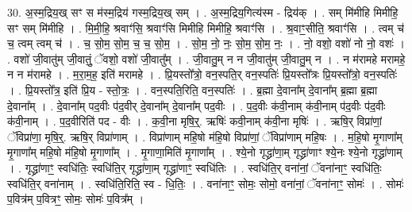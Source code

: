 \documentclass[17pt]{extarticle}
\begin{document}
30. अ॒स्म॒द्रिय॒ख् सꣳ स म॑स्म॒द्रिय॑ गस्म॒द्रिय॒ख् सम् । . अ॒स्म॒द्रिय॒गित्य॑स्म - द्रिय॑क् । . सम् मि॑मीहि मिमीहि॒ सꣳ सम् मि॑मीहि । . मि॒मी॒हि॒ श्रवाꣳ॑सि॒ श्रवाꣳ॑सि मिमीहि मिमीहि॒ श्रवाꣳ॑सि । . श्र॒वाꣳ॒॒सीति॒ श्रवाꣳ॑सि । . त्वम् च॑ च॒ त्वम् त्वम् च॑ । . च॒ सो॒म॒ सो॒म॒ च॒ च॒ सो॒म॒ । . सो॒म॒ नो॒ नः॒ सो॒म॒ सो॒म॒ नः॒ । . नो॒ वशो॒ वशो॑ नो नो॒ वशः॑ । . वशो॑ जी॒वातु॑म् जी॒वातुं॒ ॅवशो॒ वशो॑ जी॒वातु᳚म् । . जी॒वातु॒म् न न जी॒वातु॑म् जी॒वातु॒म् न । . न म॑रामहे मरामहे॒ न न म॑रामहे । . म॒रा॒म॒ह॒ इति॑ मरामहे । . प्रि॒यस्तो᳚त्रो॒ वन॒स्पति॒र् वन॒स्पतिः॑ प्रि॒यस्तो᳚त्रः प्रि॒यस्तो᳚त्रो॒ वन॒स्पतिः॑ । . प्रि॒यस्तो᳚त्र॒ इति॑ प्रि॒य - स्तो॒त्रः॒ । . वन॒स्पति॒रिति॒ वन॒स्पतिः॑ । . ब्र॒ह्मा दे॒वाना᳚म् दे॒वाना᳚म् ब्र॒ह्मा ब्र॒ह्मा दे॒वाना᳚म् । . दे॒वाना᳚म् पद॒वीः प॑द॒वीर् दे॒वाना᳚म् दे॒वाना᳚म् पद॒वीः । . प॒द॒वीः क॑वी॒नाम् क॑वी॒नाम् प॑द॒वीः प॑द॒वीः क॑वी॒नाम् । . प॒द॒वीरिति॑ पद - वीः । . क॒वी॒ना मृषि॒र्॒. ऋषिः॑ कवी॒नाम् क॑वी॒ना मृषिः॑ । . ऋषि॒र् विप्रा॑णां॒ ॅविप्रा॑णा॒ मृषि॒र्॒. ऋषि॒र् विप्रा॑णाम् । . विप्रा॑णाम् महि॒षो म॑हि॒षो विप्रा॑णां॒ ॅविप्रा॑णाम् महि॒षः । . म॒हि॒षो मृ॒गाणा᳚म् मृ॒गाणा᳚म् महि॒षो म॑हि॒षो मृ॒गाणा᳚म् । . मृ॒गाणा॒मिति॑ मृ॒गाणा᳚म् । . श्ये॒नो गृद्ध्रा॑णा॒म् गृद्ध्रा॑णाꣳ श्ये॒नः श्ये॒नो गृद्ध्रा॑णाम् । . गृद्ध्रा॑णाꣳ॒॒ स्वधि॑तिः॒ स्वधि॑ति॒र् गृद्ध्रा॑णा॒म् गृद्ध्रा॑णाꣳ॒॒ स्वधि॑तिः । . स्वधि॑ति॒र् वना॑नां॒ ॅवना॑नाꣳ॒॒ स्वधि॑तिः॒ स्वधि॑ति॒र् वना॑नाम् । . स्वधि॑ति॒रिति॒ स्व - धि॒तिः॒ । . वना॑नाꣳ॒॒ सोमः॒ सोमो॒ वना॑नां॒ ॅवना॑नाꣳ॒॒ सोमः॑ । . सोमः॑ प॒वित्र॑म् प॒वित्रꣳ॒॒ सोमः॒ सोमः॑ प॒वित्र᳚म् । \newline
\end{document}
